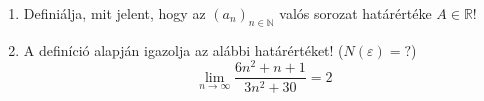 \documentclass[11pt]{scrartcl}
\begin{document}
\begin{enumerate}
	\item Definiálja, mit jelent, hogy az $(a_n)_{n \in \mathbb{N}}$ valós
	      sorozat határértéke $A \in \mathbb{R}$!

	\item A definíció alapján igazolja az alábbi határértéket!
	      ($N(\varepsilon) = ?$)
	      \[
		      \lim_{n \to \infty} \frac{6n^2 + n + 1}{3n^2 + 30} = 2
	      \]
\end{enumerate}
\end{document}
